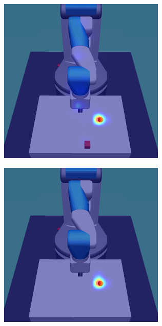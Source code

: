 \begin{figure}
  \begin{subfigure}{0.24\columnwidth}
    \includegraphics[width=\linewidth]{figures/chapter6/distractor_saliency_fetch_pro_off/shape_visual_random}
  \end{subfigure}
  \begin{subfigure}{0.24\columnwidth}
    \includegraphics[width=\linewidth]{figures/chapter6/distractor_saliency_fetch_pro_on/standard_sensor_random}

\end{subfigure}
\end{figure}
